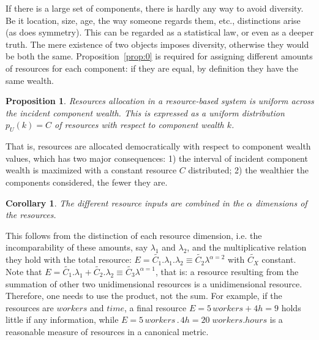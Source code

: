 \documentclass[10pt,letterpaper]{article}
\newtheorem{proposition}[theorem]{Proposition}
\newtheorem{corollary}[theorem2]{Corollary}
\begin{document}
If there is a large set of components, there is hardly any way to avoid diversity. Be it location, size, age, the way someone regards them, etc., distinctions arise (as does symmetry). This can be regarded as a statistical law, or even as a deeper truth.
The mere existence of two objects imposes diversity, otherwise they would be both the same. Proposition~\ref{prop:0} is required for assigning different amounts of resources for each component: if they are equal, by definition they have the same wealth.

\begin{proposition}\label{prop:2}
	Resources allocation in a resource-based system is uniform across the incident component wealth. This is expressed as a uniform distribution $p_U(k)=C$ of resources with respect to component wealth $k$.
\end{proposition}

That is, resources are allocated democratically with respect to component wealth values, which has two major consequences: 1) the interval of incident component wealth is maximized with a constant resource $C$ distributed; 
2) the wealthier the components considered, the fewer they are. 

\begin{corollary}\label{prop:1}
	The different resource inputs are combined in the $\alpha$ dimensions of the resources.
\end{corollary}



%

This follows from the distinction of each resource dimension,
i.e. the incomparability of these amounts, say $\lambda_1$ and $\lambda_2$, and the multiplicative relation they hold with the total resource: $E=\widetilde{C_1} . \lambda_1 . \lambda_2 \equiv \widetilde{C_2}\lambda^{\alpha=2}$
with $\widetilde{C_X}$ constant.
Note that $E=\widetilde{C_1} . \lambda_1 + \widetilde{C_2}.\lambda_2 \equiv \widetilde{C_3}\lambda^{\alpha=1}$, that is: a resource resulting from the summation of other two unidimensional resources is a unidimensional resource. Therefore, one needs to use the product, not the sum. For example, if the resources are $workers$ and $time$,
a final resource $E=5\, workers + 4h=9$
holds little if any information, while
$E= 5\, workers \, . \, 4 h= 20\; workers . hours$ is
a reasonable measure of resources in a canonical metric.
\end{document}
